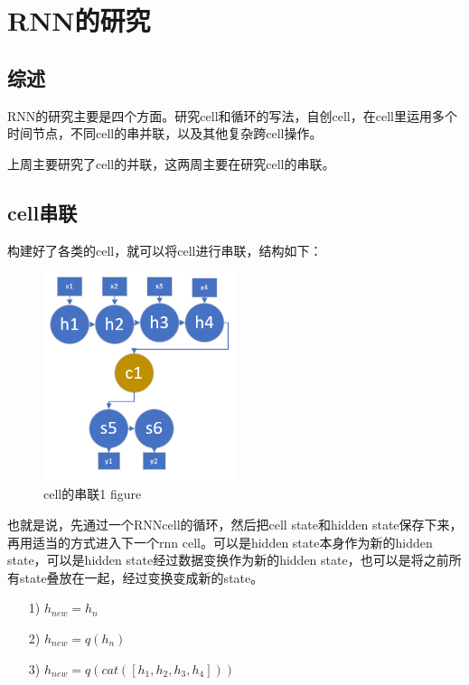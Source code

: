 \documentclass[11pt]{ctexart}
\begin{document}
\section{RNN的研究}
\subsection{综述}
RNN的研究主要是四个方面。研究cell和循环的写法，自创cell，在cell里运用多个时间节点，不同cell的串并联，以及其他复杂跨cell操作。

上周主要研究了cell的并联，这两周主要在研究cell的串联。

\subsection{cell串联}
构建好了各类的cell，就可以将cell进行串联，结构如下：
\begin{figure}[H]
\begin{center}
\includegraphics[width=0.5\textwidth]{series2.PNG}
\end{center}
\caption{cell的串联1 figure}
\label{FIG.16}
\end{figure}

也就是说，先通过一个RNNcell的循环，然后把cell state和hidden state保存下来，再用适当的方式进入下一个rnn cell。可以是hidden state本身作为新的hidden state，可以是hidden state经过数据变换作为新的hidden state，也可以是将之前所有state叠放在一起，经过变换变成新的state。
\begin{itemize}
  \item [1)]
  $h_{new} = h_n$
  \item [2)]
  $h_{new} = q(h_n)$
  \item [3)]
  $h_{new} = q(cat([h_1,h_2,h_3,h_4]))$

\end{itemize}
\end{document}
